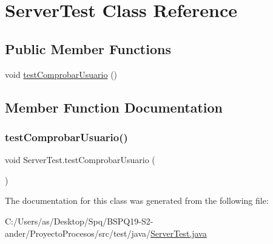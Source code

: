 \hypertarget{class_server_test}{}\section{Server\+Test Class Reference}
\label{class_server_test}
\subsection*{Public Member Functions}
\begin{DoxyCompactItemize}
\item 
void \mbox{\hyperlink{class_server_test_a7dc778001059c1afb131eb57d82aac8b}{test\+Comprobar\+Usuario}} ()
\end{DoxyCompactItemize}


\subsection{Member Function Documentation}
\mbox{\label{class_server_test_a7dc778001059c1afb131eb57d82aac8b}} 
\subsubsection{\texorpdfstring{testComprobarUsuario()}{testComprobarUsuario()}}
{\footnotesize\ttfamily void Server\+Test.\+test\+Comprobar\+Usuario (\begin{DoxyParamCaption}{ }\end{DoxyParamCaption})}



The documentation for this class was generated from the following file\+:\begin{DoxyCompactItemize}
\item 
C\+:/\+Users/as/\+Desktop/\+Spq/\+B\+S\+P\+Q19-\/\+S2-\/ander/\+Proyecto\+Procesos/src/test/java/\mbox{\hyperlink{_server_test_8java}{Server\+Test.\+java}}\end{DoxyCompactItemize}
